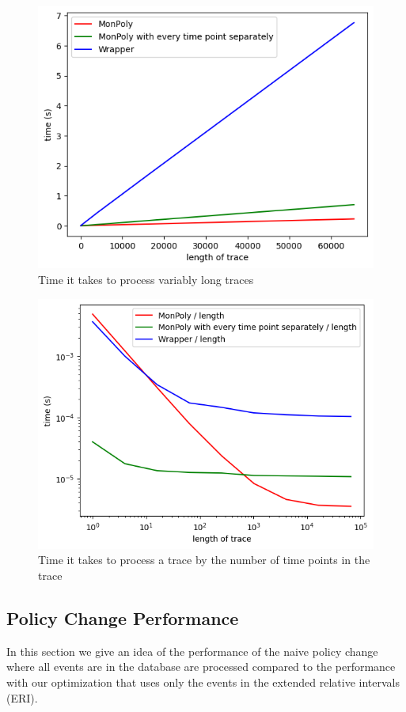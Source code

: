 \begin{figure}
    \centering
    \label{fig:monpoly-wrapper-total}
    \includegraphics[width=0.8\linewidth]{diagrams/wrapper-monpoly-total.png}
    \caption{Time it takes to process variably long traces}
\end{figure}

\begin{figure}
    \centering
    \label{fig:monpoly-wrapper-per-time-point}
    \includegraphics[width=0.8\linewidth]{diagrams/wrapper-monpoly-per-time-point.png}
    \caption{Time it takes to process a trace by the number of time points in the trace}
\end{figure}

\subsection{Policy Change Performance}

In this section we give an idea of the performance of the naive policy change where all events are in the database are processed compared to the performance with our optimization that uses only the events in the extended relative intervals (ERI).

